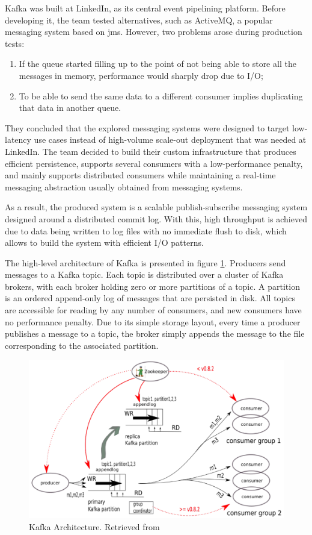 Kafka was built at LinkedIn, as its central event pipelining platform.
Before developing it, the team tested alternatives, such as ActiveMQ, a popular messaging system based on \gls{jms}.
However, two problems arose during production tests:
\begin{enumerate}
    \item If the queue started filling up to the point of not being able to store all the messages in memory, performance would sharply drop due to I/O;
    \item To be able to send the same data to a different consumer implies duplicating that data in another queue.
\end{enumerate}

They concluded that the explored messaging systems were designed to target low-latency use cases instead of high-volume scale-out deployment that was needed at LinkedIn.
The team decided to build their custom infrastructure that produces efficient persistence, supports several consumers with a low-performance penalty, and mainly supports distributed consumers while maintaining a real-time messaging abstraction usually obtained from messaging systems.

As a result, the produced system is a scalable publish-subscribe messaging system designed around a distributed commit log.
With this, high throughput is achieved due to data being written to log files with no immediate flush to disk, which allows to build the system with efficient I/O patterns.

The high-level architecture of Kafka is presented in figure \ref{fig:kafka}.
Producers send messages to a Kafka topic.
Each topic is distributed over a cluster of Kafka brokers, with each broker holding zero or more partitions of a topic.
A partition is an ordered append-only log of messages that are persisted in disk.
All topics are accessible for reading by any number of consumers, and new consumers have no performance penalty.
Due to its simple storage layout, every time a producer publishes a message to a topic, the broker simply appends the message to the file corresponding to the associated partition.

\begin{figure}[H]
    \center
    \includegraphics[width=.8\textwidth]{kafka}
    \caption{Kafka Architecture. Retrieved from \cite{kafka-vs-rabbitmq}}
    \label{fig:kafka}
\end{figure}

